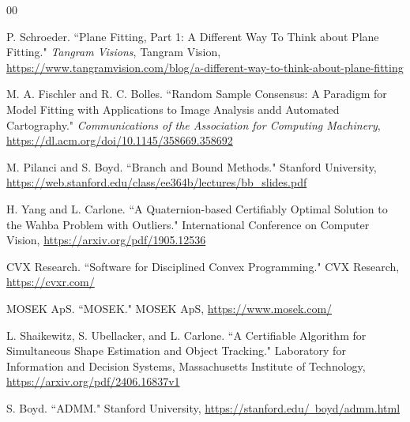 \documentclass[conference]{IEEEtran}
\begin{document}
\begin{thebibliography}{00}

 P. Schroeder. ``Plane Fitting, Part 1: A Different Way To Think about Plane Fitting." \textit{Tangram Visions}, Tangram Vision, \href{https://www.tangramvision.com/blog/a-different-way-to-think-about-plane-fitting}{https://www.tangramvision.com/blog/a-different-way-to-think-about-plane-fitting}

 M. A. Fischler and R. C. Bolles. ``Random Sample Consensus: A Paradigm for Model Fitting with Applications to Image Analysis andd Automated Cartography." \textit{Communications of the Association for Computing Machinery}, \href{https://dl.acm.org/doi/10.1145/358669.358692}{https://dl.acm.org/doi/10.1145/358669.358692}

 M. Pilanci and S. Boyd. ``Branch and Bound Methods." Stanford University, \href{https://web.stanford.edu/class/ee364b/lectures/bb_slides.pdf}{https://web.stanford.edu/class/ee364b/lectures/bb\_slides.pdf}

 H. Yang and L. Carlone. ``A Quaternion-based Certifiably Optimal Solution to the Wahba Problem with Outliers." International Conference on Computer Vision, \href{https://arxiv.org/pdf/1905.12536}{https://arxiv.org/pdf/1905.12536}

 CVX Research. ``Software for Disciplined Convex Programming." CVX Research, \href{https://cvxr.com/}{https://cvxr.com/}

 MOSEK ApS. ``MOSEK." MOSEK ApS, \href{https://www.mosek.com/}{https://www.mosek.com/}

 L. Shaikewitz, S. Ubellacker, and L. Carlone. ``A Certifiable Algorithm for Simultaneous Shape Estimation and Object Tracking." Laboratory for Information and Decision Systems, Massachusetts Institute of Technology, \href{https://arxiv.org/pdf/2406.16837v1}{https://arxiv.org/pdf/2406.16837v1}

 S. Boyd. ``ADMM." Stanford University, \href{https://stanford.edu/~boyd/admm.html}{https://stanford.edu/~boyd/admm.html}

\end{thebibliography}
\end{document}
